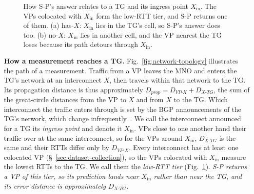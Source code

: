 
\begin{figure}[t]
    \centering
    
    \vspace{-1ex}
    \caption{How S-P's answer relates to a TG and its ingress point $X_{\mathrm{in}}$. The VPs colocated with $X_{\mathrm{in}}$ form the low-RTT tier, and S-P returns one of them. (a) has-$X$: $X_{\mathrm{in}}$ lies in the TG's cell, so S-P's answer does too. (b) no-$X$: $X_{\mathrm{in}}$ lies in another cell, and the VP nearest the TG loses because its path detours through $X_{\mathrm{in}}$.}
    \label{fig:sp-schematic}
\end{figure}

\noindent \textbf{How a measurement reaches a TG.} Fig.~\ref{fig:network-topology} illustrates the path of a measurement. Traffic from a VP leaves the MNO and enters the TG's network at an interconnect $X$, then travels within that network to the TG. Its propagation distance is thus approximately $D_{prop} = D_{VP\text{-}X} + D_{X\text{-}TG}$, the sum of the great-circle distances from the VP to $X$ and from $X$ to the TG. Which interconnect the traffic enters through is set by the BGP announcements of the TG's network, which change infrequently~. We call the interconnect announced for a TG its \emph{ingress point} and denote it $X_{\mathrm{in}}$. VPs close to one another hand their traffic over at the same interconnect, so for the VPs around $X_{\mathrm{in}}$, $D_{X\text{-}TG}$ is the same and their RTTs differ only by $D_{VP\text{-}X}$. Every interconnect has at least one colocated VP (\S~\ref{sec:dataset-collection}), so the VPs colocated with $X_{\mathrm{in}}$ measure the lowest RTTs to the TG. We call them the \emph{low-RTT tier} (Fig.~\ref{fig:sp-schematic}). \emph{S-P returns a VP of this tier, so its prediction lands near $X_{\mathrm{in}}$ rather than near the TG, and its error distance is approximately $D_{X\text{-}TG}$.}

